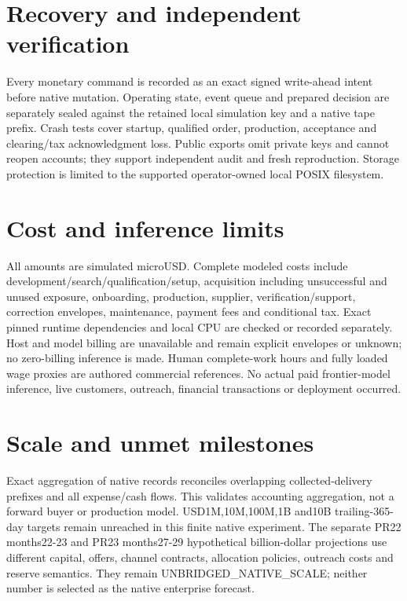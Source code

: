 \documentclass[10pt,letterpaper]{article}
\begin{document}
\section{Recovery and independent verification}
Every monetary command is recorded as an exact signed write-ahead intent before native mutation. Operating state, event queue and prepared decision are separately sealed against the retained local simulation key and a native tape prefix. Crash tests cover startup, qualified order, production, acceptance and clearing/tax acknowledgment loss. Public exports omit private keys and cannot reopen accounts; they support independent audit and fresh reproduction. Storage protection is limited to the supported operator-owned local POSIX filesystem.
\section{Cost and inference limits}
All amounts are simulated microUSD. Complete modeled costs include development/search/qualification/setup, acquisition including unsuccessful and unused exposure, onboarding, production, supplier, verification/support, correction envelopes, maintenance, payment fees and conditional tax. Exact pinned runtime dependencies and local CPU are checked or recorded separately. Host and model billing are unavailable and remain explicit envelopes or unknown; no zero-billing inference is made. Human complete-work hours and fully loaded wage proxies are authored commercial references. No actual paid frontier-model inference, live customers, outreach, financial transactions or deployment occurred.
\section{Scale and unmet milestones}
Exact aggregation of native records reconciles overlapping collected-delivery prefixes and all expense/cash flows. This validates accounting aggregation, not a forward buyer or production model. USD1M,10M,100M,1B and10B trailing-365-day targets remain unreached in this finite native experiment. The separate PR22 months22-23 and PR23 months27-29 hypothetical billion-dollar projections use different capital, offers, channel contracts, allocation policies, outreach costs and reserve semantics. They remain UNBRIDGED\_NATIVE\_SCALE; neither number is selected as the native enterprise forecast.
\end{document}
